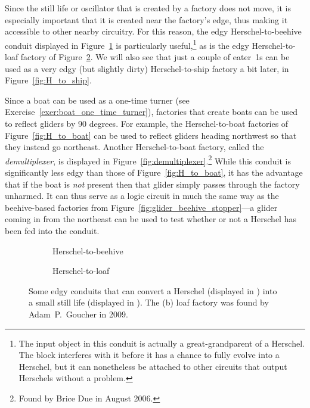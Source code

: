 Since the still life or oscillator that is created by a factory does not move, it is especially important that it is created near the factory's edge, thus making it accessible to other nearby circuitry. For this reason, the edgy Herschel-to-beehive conduit displayed in Figure~\ref{fig:H_to_beehive} is particularly useful,\footnote{The input object in this conduit is actually a great-grandparent of a Herschel. The block interferes with it before it has a chance to fully evolve into a Herschel, but it can nonetheless be attached to other circuits that output Herschels without a problem.} as is the edgy Herschel-to-loaf factory of Figure~\ref{fig:H_to_loaf}. We will also see that just a couple of eater~1s can be used as a very edgy (but slightly dirty) Herschel-to-ship factory a bit later, in Figure~\ref{fig:H_to_ship}.

Since a boat can be used as a one-time turner (see Exercise~\ref{exer:boat_one_time_turner}), factories that create boats can be used to reflect gliders by 90 degrees. For example, the Herschel-to-boat factories of Figure~\ref{fig:H_to_boat} can be used to reflect gliders heading northwest so that they instead go northeast. Another Herschel-to-boat factory, called the \emph{demultiplexer}, is displayed in Figure~\ref{fig:demultiplexer}.\footnote{Found by Brice Due in August 2006.} While this conduit is significantly less edgy than those of Figure~\ref{fig:H_to_boat}, it has the advantage that if the boat is \emph{not} present then that glider simply passes through the factory unharmed. It can thus serve as a logic circuit in much the same way as the beehive-based factories from Figure~\ref{fig:glider_beehive_stopper}---a glider coming in from the northeast can be used to test whether or not a Herschel has been fed into the conduit.

\begin{figure}[!htb]
	\centering
	\begin{subfigure}{.38\textwidth}
		\centering{}
		\caption{Herschel-to-beehive}\label{fig:H_to_beehive}
	\end{subfigure} \hfill
	\begin{subfigure}{.58\textwidth}
		\centering{}
		\caption{Herschel-to-loaf}\label{fig:H_to_loaf}
	\end{subfigure}
	\caption{Some edgy conduits that can convert a Herschel (displayed in ) into a small still life (displayed in ). The (b) loaf factory was found by Adam~P.~Goucher in 2009.}
	\label{fig:H_to_beehive_loaf}
\end{figure}


